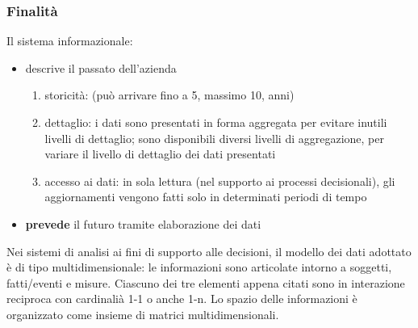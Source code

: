 \subsubsection{Finalit\`a}
Il sistema informazionale:
\begin{itemize}
  \item descrive il passato dell'azienda
  \begin{enumerate}
    \item storicit\`a: (pu\`o arrivare fino a 5, massimo 10, anni)
    \item dettaglio: i dati sono presentati in forma aggregata per evitare inutili
    livelli di dettaglio; sono disponibili diversi livelli di aggregazione, per variare
    il livello di dettaglio dei dati presentati
    \item accesso ai dati: in sola lettura (nel supporto ai processi decisionali),
    gli aggiornamenti vengono fatti solo in determinati periodi di tempo
  \end{enumerate}
  \item \textbf{prevede} il futuro tramite elaborazione dei dati
\end{itemize}

Nei sistemi di analisi ai fini di supporto alle decisioni, il modello dei dati adottato
\`e di tipo multidimensionale: le informazioni sono articolate intorno a soggetti, fatti/eventi e misure.
Ciascuno dei tre elementi appena citati sono in interazione reciproca con cardinali\`a 1-1 o anche 1-n.
Lo spazio delle informazioni \`e organizzato come insieme di matrici multidimensionali.

